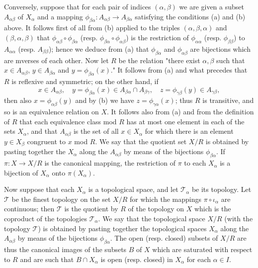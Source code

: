 Conversely, suppose that for each pair of indices $(\alpha,\beta)$ we are given a subset $A_{\alpha\beta}$ of $X_\alpha$ and a mapping $\phi_{\beta\alpha}:A_{\alpha\beta}\to A_{\beta\alpha}$ satisfying the conditions (a) and (b) above. It follows first of all from (b) applied to the triples $(\alpha,\beta,\alpha)$ and $(\beta,\alpha,\beta)$ that $\phi_{\alpha\beta}\circ\phi_{\beta\alpha}$ (resp. $\phi_{\beta\alpha}\circ\phi_{\alpha\beta}$) is the restriction of $\phi_{\alpha\alpha}$ (resp. $\phi_{\beta\beta}$) to $A_{\alpha\alpha}$ (resp. $A_{\beta\beta}$); hence we deduce from (a) that $\phi_{\beta\alpha}$ and $\phi_{\alpha\beta}$ are bijections which are mverses of each other. Now let $R$ be the relation "there exist $\alpha,\beta$ such that $x\in A_{\alpha\beta}$, $y\in A_{\beta\alpha}$ and $y=\phi_{\beta\alpha}(x)$." It follows from (a) and what precedes that $R$ is reflexive and symmetric; on the other hand, if 
\[x\in A_{\alpha\beta},\quad y=\phi_{\beta\alpha}(x)\in A_{\beta\alpha}\cap A_{\beta\gamma},\quad z=\phi_{\gamma\beta}(y)\in A_{\gamma\beta},\]
then also $x=\phi_{\alpha\beta}(y)$ and by (b) we have $z=\phi_{\gamma\alpha}(x)$; thus $R$ is transitive, and so is an equivalence relation on $X$. It follows also from (a) and from the definition of $R$ that each equivalence class mod $R$ has at most one element in each of the sets $X_\alpha$, and that $A_{\alpha\beta}$ is the set of all $x\in X_\alpha$ for which there is an element $y\in X_\beta$ congruent to $x$ mod $R$. We say that the quotient set $X/R$ is obtained by pasting together the $X_\alpha$ along the $A_{\alpha\beta}$ by means of the bijections $\phi_{\beta\alpha}$. If $\pi:X\to X/R$ is the canonical mapping, the restriction of $\pi$ to each $X_\alpha$ is a bijection of $X_\alpha$ onto $\pi(X_\alpha)$.\par
Now suppose that each $X_\alpha$ is a topological space, and let $\mathcal{T}_\alpha$ be its topology. Let $\mathcal{T}$ be the finest topology on the set $X/R$ for which the mappings $\pi\circ\iota_\alpha$ are continuous; then $\mathcal{T}$ is the quotient by $R$ of the topology on $X$ which is the coproduct of the topologies $\mathcal{T}_\alpha$. We say that the topological space $X/R$ (with the topology $\mathcal{T}$) is obtained by pasting together the topological spaces $X_\alpha$ along the $A_{\alpha\beta}$ by means of the bijections $\phi_{\beta\alpha}$. The open (resp. closed) subsets of $X/R$ are thus the canonical images of the subsets $B$ of $X$ which are saturated with respect to $R$ and are such that $B\cap X_\alpha$ is open (resp. closed) in $X_\alpha$ for each $\alpha\in I$.\par
